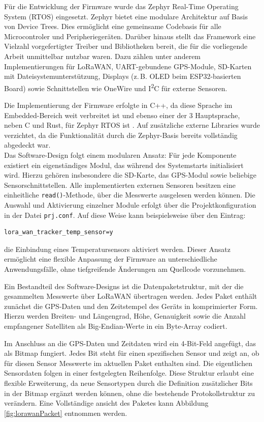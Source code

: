 \label{sec:toolingsoftware}
Für die Entwicklung der Firmware wurde das Zephyr Real-Time Operating System (RTOS) eingesetzt. Zephyr bietet eine modulare Architektur auf Basis von Device Trees. Dies ermöglicht eine gemeinsame Codebasis für alle Microcontroler und Peripheriegeräten. Darüber hinaus stellt das Framework eine Vielzahl vorgefertigter Treiber und Bibliotheken bereit, die für die vorliegende Arbeit unmittelbar nutzbar waren. Dazu zählen unter anderem Implementierungen für LoRaWAN, UART-gebundene GPS-Module, SD-Karten mit Dateisystemunterstützung, Displays (z.\,B. OLED beim ESP32-basierten Board) sowie Schnittstellen wie OneWire und I\textsuperscript{2}C für externe Sensoren. 

Die Implementierung der Firmware erfolgte in C++, da diese Sprache im Embedded-Bereich weit verbreitet ist und ebenso einer der 3 Hauptsprache, neben C und Rust, für Zephyr RTOS ist \autocite{LanguageSupportZephyr}. Auf zusätzliche externe Libraries wurde verzichtet, da die Funktionalität durch die Zephyr-Basis bereits vollständig abgedeckt war. \\

Das Software-Design folgt einem modularen Ansatz: Für jede Komponente existiert ein eigenständiges Modul, das während des Systemstarts initialisiert wird. Hierzu gehören insbesondere die SD-Karte, das GPS-Modul sowie beliebige Sensorschnittstellen. Alle implementierten externen Sensoren besitzen eine einheitliche \texttt{read()}-Methode, über die Messwerte ausgelesen werden können. Die Auswahl und Aktivierung einzelner Module erfolgt über die Projektkonfiguration in der Datei \texttt{prj.conf}. Auf diese Weise kann beispielsweise über den Eintrag:
\begin{verbatim}
lora_wan_tracker_temp_sensor=y
\end{verbatim}
die Einbindung eines Temperatursensors aktiviert werden. Dieser Ansatz ermöglicht eine flexible Anpassung der Firmware an unterschiedliche Anwendungsfälle, ohne tiefgreifende Änderungen am Quellcode vorzunehmen.

Ein Bestandteil des Software-Designs ist die Datenpaketstruktur, mit der die gesammelten Messwerte über LoRaWAN übertragen werden. Jedes Paket enthält zunächst die GPS-Daten und den Zeitstempel des Geräts in komprimierter Form. Hierzu werden Breiten- und Längengrad, Höhe, Genauigkeit sowie die Anzahl empfangener Satelliten als Big-Endian-Werte in ein Byte-Array codiert.

Im Anschluss an die GPS-Daten und Zeitdaten wird ein 4-Bit-Feld angefügt, das als Bitmap fungiert. Jedes Bit steht für einen spezifischen Sensor und zeigt an, ob für diesen Sensor Messwerte im aktuellen Paket enthalten sind. Die eigentlichen Sensordaten folgen in einer festgelegten Reihenfolge. Diese Struktur erlaubt eine flexible Erweiterung, da neue Sensortypen durch die Definition zusätzlicher Bits in der Bitmap ergänzt werden können, ohne die bestehende Protokollstruktur zu verändern. Eine Vollständige ansicht des Paketes kann Abbildung \ref{fig:lorawanPacket} entnommen werden.

